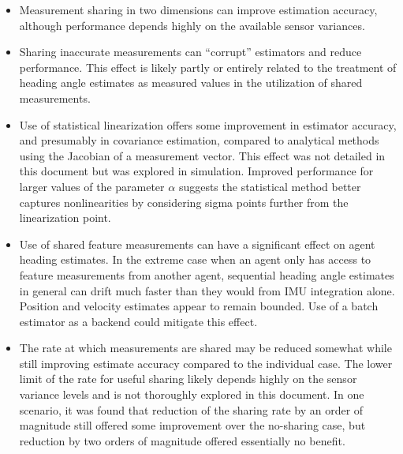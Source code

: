 \documentclass{aiaa-tc}
\begin{document}
\begin{itemize}
\item Measurement sharing in two dimensions can improve estimation accuracy, although performance depends highly on the available sensor variances.
\item Sharing inaccurate measurements can ``corrupt'' estimators and reduce performance. This effect is likely partly or entirely related to the treatment of heading angle estimates as measured values in the utilization of shared measurements.
\item Use of statistical linearization offers some improvement in estimator accuracy, and presumably in covariance estimation, compared to analytical methods using the Jacobian of a measurement vector. This effect was not detailed in this document but was explored in simulation. Improved performance for larger values of the parameter $\alpha$ suggests the statistical method better captures nonlinearities by considering sigma points further from the linearization point.
\item Use of shared feature measurements can have a significant effect on agent heading estimates. In the extreme case when an agent only has access to feature measurements from another agent, sequential heading angle estimates in general can drift much faster than they would from IMU integration alone. Position and velocity estimates appear to remain bounded. Use of a batch estimator as a backend could mitigate this effect.
\item The rate at which measurements are shared may be reduced somewhat while still improving estimate accuracy compared to the individual case. The lower limit of the rate for useful sharing likely depends highly on the sensor variance levels and is not thoroughly explored in this document. In one scenario, it was found that reduction of the sharing rate by an order of magnitude still offered some improvement over the no-sharing case, but reduction by two orders of magnitude offered essentially no benefit.
\end{itemize}



\end{document}

